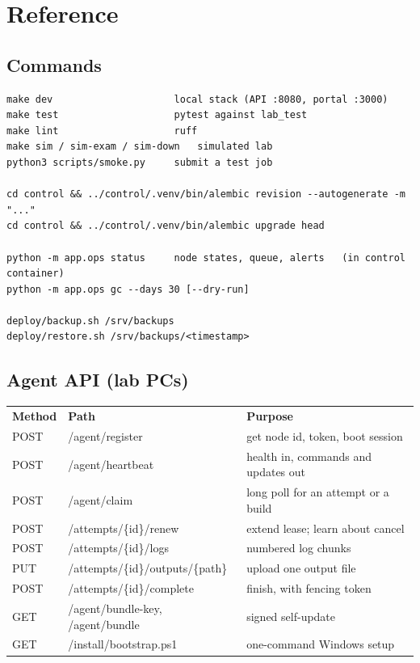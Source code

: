 \section{Reference}

\subsection{Commands}

\begin{verbatim}
make dev                     local stack (API :8080, portal :3000)
make test                    pytest against lab_test
make lint                    ruff
make sim / sim-exam / sim-down   simulated lab
python3 scripts/smoke.py     submit a test job

cd control && ../control/.venv/bin/alembic revision --autogenerate -m "..."
cd control && ../control/.venv/bin/alembic upgrade head

python -m app.ops status     node states, queue, alerts   (in control container)
python -m app.ops gc --days 30 [--dry-run]

deploy/backup.sh /srv/backups
deploy/restore.sh /srv/backups/<timestamp>
\end{verbatim}

\subsection{Agent API (lab PCs)}

\begin{center}
\begin{tabular}{lll}
\textbf{Method} & \textbf{Path} & \textbf{Purpose} \\
POST & /agent/register & get node id, token, boot session \\
POST & /agent/heartbeat & health in, commands and updates out \\
POST & /agent/claim & long poll for an attempt or a build \\
POST & /attempts/\{id\}/renew & extend lease; learn about cancel \\
POST & /attempts/\{id\}/logs & numbered log chunks \\
PUT & /attempts/\{id\}/outputs/\{path\} & upload one output file \\
POST & /attempts/\{id\}/complete & finish, with fencing token \\
GET & /agent/bundle-key, /agent/bundle & signed self-update \\
GET & /install/bootstrap.ps1 & one-command Windows setup \\
\end{tabular}
\end{center}

